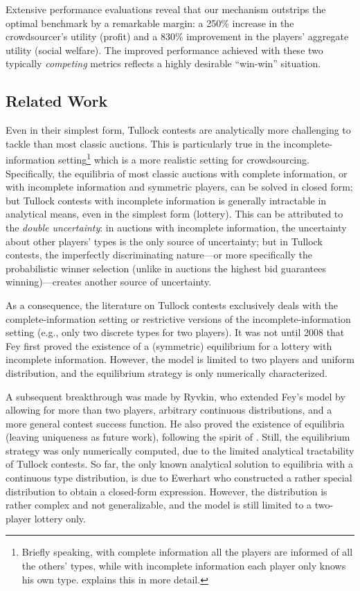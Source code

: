 \documentclass{sig-alternate-10pt}
\begin{document}
Extensive performance evaluations reveal that our mechanism outstrips the optimal benchmark by a remarkable margin: a 250\% increase in the crowdsourcer's utility (profit) and a 830\% improvement in the players' aggregate utility (social welfare). The improved performance achieved with these two typically {\em competing} metrics reflects a highly desirable ``win-win'' situation.

\subsection{Related Work}


Even in their simplest form, Tullock contests are analytically more challenging to tackle than most classic auctions. This is particularly true in the incomplete-information setting\footnote{Briefly speaking, with complete information all the players are informed of all the others' types, while with incomplete information each player only knows his own type.  explains this in more detail.} which is a more realistic setting for crowdsourcing. Specifically, the equilibria of most classic auctions with complete information, or with incomplete information and symmetric players, can be solved in closed form; but Tullock contests with incomplete information is generally intractable in analytical means, even in the simplest form (lottery)\cite{Konrad09book}. This can be attributed to the {\em double uncertainty}: in auctions with incomplete information, the uncertainty about other players' types is the only source of uncertainty; but in Tullock contests, the imperfectly discriminating nature---or more specifically the probabilistic winner selection (unlike in auctions the highest bid guarantees winning)---creates another source of uncertainty.

As a consequence, the literature on Tullock contests exclusively deals with the complete-information setting or restrictive versions of the incomplete-information setting (e.g., only two discrete types for two players\cite{MY04}). It was not until 2008 that Fey\cite{Fey08} first proved the existence of a (symmetric) equilibrium for a lottery with incomplete information. However, the model is limited to two players and uniform distribution, and the equilibrium strategy is only numerically characterized.

A subsequent breakthrough was made by Ryvkin\cite{Ryvkin10}, who extended Fey's model\cite{Fey08} by allowing for more than two players, arbitrary continuous distributions, and a more general contest success function. He also proved the existence of equilibria (leaving uniqueness as future work), following the spirit of \cite{Fey08}. Still, the equilibrium strategy was only numerically computed, due to the limited analytical tractability of Tullock contests.  So far, the only known analytical solution to equilibria with a continuous type distribution, is due to Ewerhart\cite{Ewer10IPV} who constructed a rather special distribution to obtain a closed-form expression. However, the distribution is rather complex and not generalizable, and the model is still limited to a two-player lottery only.
\end{document}
